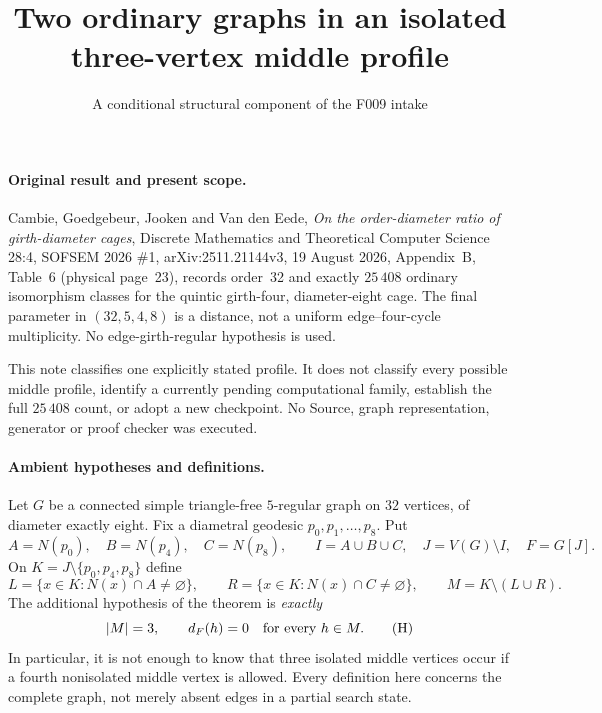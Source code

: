 \documentclass[11pt]{article}
\title{Two ordinary graphs in an isolated three-vertex middle profile}
\author{A conditional structural component of the F009 intake}
\date{}
\begin{document}
\maketitle

\paragraph{Original result and present scope.}
Cambie, Goedgebeur, Jooken and Van den Eede,
\emph{On the order-diameter ratio of girth-diameter cages},
Discrete Mathematics and Theoretical Computer Science 28:4, SOFSEM 2026
\#1, arXiv:2511.21144v3, 19 August 2026, Appendix~B, Table~6
(physical page~23), records order~32 and exactly $25\,408$ ordinary
isomorphism classes for the quintic girth-four, diameter-eight cage.
The final parameter in $(32,5,4,8)$ is a distance, not a uniform
edge--four-cycle multiplicity. No edge-girth-regular hypothesis is used.

This note classifies one explicitly stated profile. It does not classify
every possible middle profile, identify a currently pending computational
family, establish the full $25\,408$ count, or adopt a new checkpoint.
No Source, graph representation, generator or proof checker was executed.

\paragraph{Ambient hypotheses and definitions.}
Let $G$ be a connected simple triangle-free $5$-regular graph on $32$
vertices, of diameter exactly eight. Fix a diametral geodesic
$p_0,p_1,\ldots,p_8$. Put
\[
 A=N(p_0),\quad B=N(p_4),\quad C=N(p_8),\qquad
 I=A\cup B\cup C,\quad J=V(G)\setminus I,\quad F=G[J].
\]
On $K=J\setminus\{p_0,p_4,p_8\}$ define
\[
 L=\{x\in K:N(x)\cap A\ne\varnothing\},\qquad
 R=\{x\in K:N(x)\cap C\ne\varnothing\},\qquad
 M=K\setminus(L\cup R).
\]
The additional hypothesis of the theorem is \emph{exactly}
\[
 |M|=3,\qquad d_F(h)=0\quad\hbox{for every }h\in M.       \tag{H}
\]
In particular, it is not enough to know that three isolated middle
vertices occur if a fourth nonisolated middle vertex is allowed.
Every definition here concerns the complete graph, not merely absent
edges in a partial search state.
\end{document}
